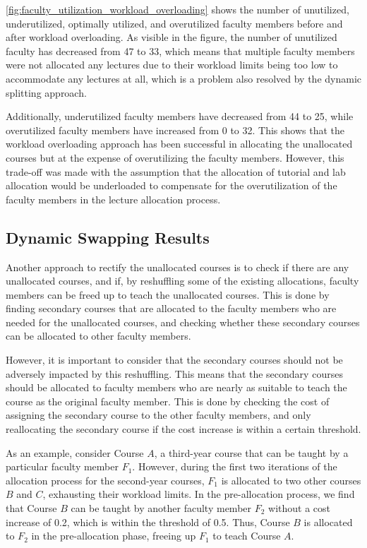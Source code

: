 \autoref{fig:faculty_utilization_workload_overloading} shows the number of unutilized, underutilized, optimally utilized, and overutilized faculty members before and after workload overloading. As visible in the figure, the number of unutilized faculty has decreased from 47 to 33, which means that multiple faculty members were not allocated any lectures due to their workload limits being too low to accommodate any lectures at all, which is a problem also resolved by the dynamic splitting approach.

Additionally, underutilized faculty members have decreased from 44 to 25, while overutilized faculty members have increased from 0 to 32. This shows that the workload overloading approach has been successful in allocating the unallocated courses but at the expense of overutilizing the faculty members. However, this trade-off was made with the assumption that the allocation of tutorial and lab allocation would be underloaded to compensate for the overutilization of the faculty members in the lecture allocation process.

\subsection{Dynamic Swapping Results}
\label{sec:post_allocation}

Another approach to rectify the unallocated courses is to check if there are any unallocated courses, and if, by reshuffling some of the existing allocations, faculty members can be freed up to teach the unallocated courses. This is done by finding secondary courses that are allocated to the faculty members who are needed for the unallocated courses, and checking whether these secondary courses can be allocated to other faculty members.

However, it is important to consider that the secondary courses should not be adversely impacted by this reshuffling. This means that the secondary courses should be allocated to faculty members who are nearly as suitable to teach the course as the original faculty member. This is done by checking the cost of assigning the secondary course to the other faculty members, and only reallocating the secondary course if the cost increase is within a certain threshold.

As an example, consider Course $A$, a third-year course that can be taught by a particular faculty member $F_1$. However, during the first two iterations of the allocation process for the second-year courses, $F_1$ is allocated to two other courses $B$ and $C$, exhausting their workload limits. In the pre-allocation process, we find that Course $B$ can be taught by another faculty member $F_2$ without a cost increase of 0.2, which is within the threshold of 0.5. Thus, Course $B$ is allocated to $F_2$ in the pre-allocation phase, freeing up $F_1$ to teach Course $A$.

